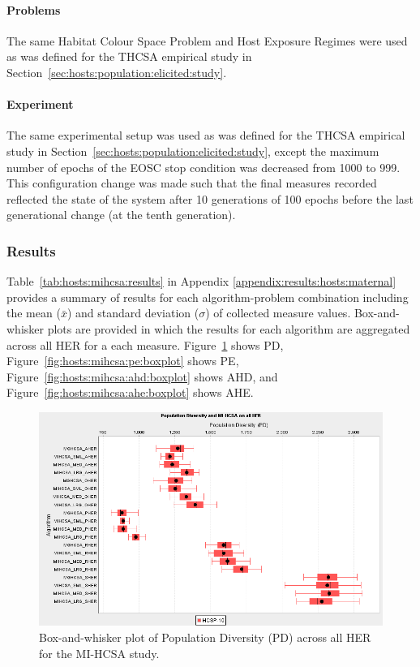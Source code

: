 %
%
\paragraph{Problems}
The same Habitat Colour Space Problem and Host Exposure Regimes were used as was defined for the THCSA empirical study in Section~\ref{sec:hosts:population:elicited:study}.

%
%
\paragraph{Experiment}
The same experimental setup was used as was defined for the THCSA empirical study in Section~\ref{sec:hosts:population:elicited:study}, except the maximum number of epochs of the EOSC stop condition was decreased from 1000 to 999. This configuration change was made such that the final measures recorded reflected the state of the system after 10 generations of 100 epochs before the last generational change (at the tenth generation).

%
%
\subsubsection{Results}
Table~\ref{tab:hosts:mihcsa:results} in Appendix \ref{appendix:results:hosts:maternal} provides a summary of results for each algorithm-problem combination including the mean ($\bar{x}$) and standard deviation ($\sigma$) of collected measure values.  Box-and-whisker plots are provided in which the results for each algorithm are aggregated across all HER for a each measure. Figure~\ref{fig:hosts:mihcsa:pd:boxplot} shows PD, Figure~\ref{fig:hosts:mihcsa:pe:boxplot} shows PE, Figure~\ref{fig:hosts:mihcsa:ahd:boxplot} shows AHD, and Figure~\ref{fig:hosts:mihcsa:ahe:boxplot} shows AHE.

\begin{figure}[htp]
	\centering
		\includegraphics[scale=0.70]{Hosts/MI-HCSA-PD}
	\caption{Box-and-whisker plot of Population Diversity (PD) across all HER for the MI-HCSA study.}
	\label{fig:hosts:mihcsa:pd:boxplot}
\end{figure}

